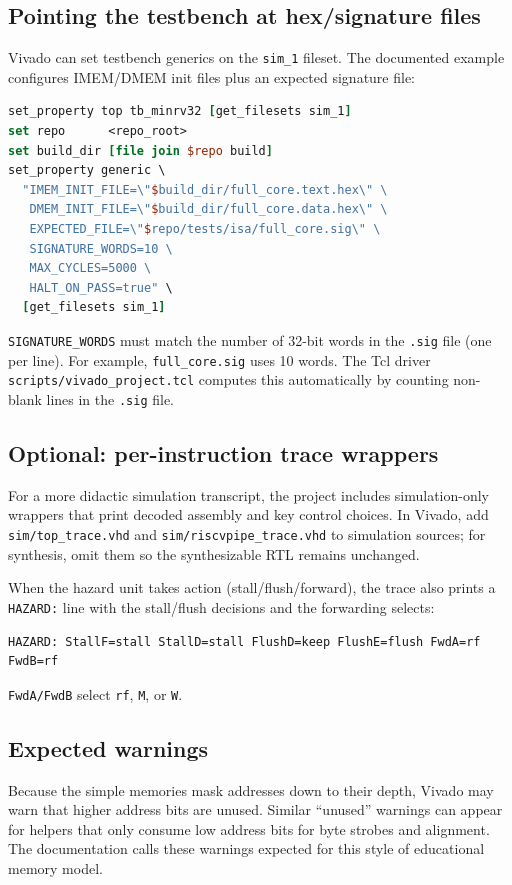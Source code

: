 \subsection{Pointing the testbench at hex/signature files}
\label{sec:vivado-tb-generics}
Vivado can set testbench generics on the \texttt{sim\_1} fileset. The documented
example configures IMEM/DMEM init files plus an expected signature file:
\begin{lstlisting}[style=minrv,language=tcl]
set_property top tb_minrv32 [get_filesets sim_1]
set repo      <repo_root>
set build_dir [file join $repo build]
set_property generic \
  "IMEM_INIT_FILE=\"$build_dir/full_core.text.hex\" \
   DMEM_INIT_FILE=\"$build_dir/full_core.data.hex\" \
   EXPECTED_FILE=\"$repo/tests/isa/full_core.sig\" \
   SIGNATURE_WORDS=10 \
   MAX_CYCLES=5000 \
   HALT_ON_PASS=true" \
  [get_filesets sim_1]
\end{lstlisting}

\noindent
\texttt{SIGNATURE\_WORDS} must match the number of 32-bit words in the
\texttt{.sig} file (one per line). For example, \texttt{full\_core.sig} uses 10
words. The Tcl driver \texttt{scripts/vivado\_project.tcl} computes this
automatically by counting non-blank lines in the \texttt{.sig} file.

\subsection{Optional: per-instruction trace wrappers}
For a more didactic simulation transcript, the project includes simulation-only
wrappers that print decoded assembly and key control choices. In Vivado, add
\texttt{sim/top\_trace.vhd} and \texttt{sim/riscvpipe\_trace.vhd} to simulation
sources; for synthesis, omit them so the synthesizable RTL remains unchanged.

When the hazard unit takes action (stall/flush/forward), the trace also prints
a \texttt{HAZARD:} line with the stall/flush decisions and the forwarding
selects:
\begin{lstlisting}[style=minrv]
HAZARD: StallF=stall StallD=stall FlushD=keep FlushE=flush FwdA=rf FwdB=rf
\end{lstlisting}
\noindent
\texttt{FwdA/FwdB} select \texttt{rf}, \texttt{M}, or \texttt{W}.

\subsection{Expected warnings}
Because the simple memories mask addresses down to their depth, Vivado may warn
that higher address bits are unused. Similar ``unused'' warnings can appear for
helpers that only consume low address bits for byte strobes and alignment. The
documentation calls these warnings expected for this style of educational memory model.

